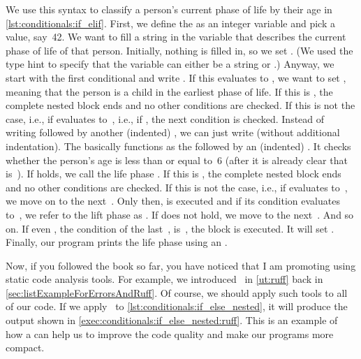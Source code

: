 We use this syntax to classify a person's current phase of life by their age in \cref{lst:conditionals:if_elif}.
First, we define the  as an integer variable and pick a value, say~42.
We want to fill a string in the variable  that describes the current phase of life of that person.
Initially, nothing is filled in, so we set .
(We used the type hint  to specify that the variable can either be a string or .)
Anyway, we start with the first conditional and write .
If this evaluates to , we want to set , meaning that the person is a child in the earliest phase of life.
If this is , the complete nested  block ends and no other conditions are checked.
If this is not the case, i.e., if  evaluates to~, i.e., if , the next condition is checked.
Instead of writing  followed by another (indented) , we can just write  (without additional indentation).
The  basically functions as the  followed by an (indented) .
It checks whether the person's age is less than or equal to~6 (after it is already clear that  is~).
If  holds, we call the life phase .
If this is , the complete nested  block ends and no other conditions are checked.
If this is not the case, i.e., if  evaluates to~, we move on to the next~.
Only then,  is executed and if its condition evaluates to~, we refer to the lift phase as .
If  does not hold, we move to the next~.
And so on.
If even , the condition of the last~, is~, the  block is executed.
It will set .
Finally, our program prints the life phase using an .

Now, if you followed the book so far, you have noticed that I am promoting using static code analysis tools.
For example, we introduced \ruff\ in \cref{ut:ruff} back in \cref{sec:listExampleForErrorsAndRuff}.
Of course, we should apply such tools to all of our code.
If we apply \ruff\ to \cref{lst:conditionals:if_else_nested}, it will produce the output shown in \cref{exec:conditionals:if_else_nested:ruff}.
This is an example of how a  can help us to improve the code quality and make our programs more compact.

